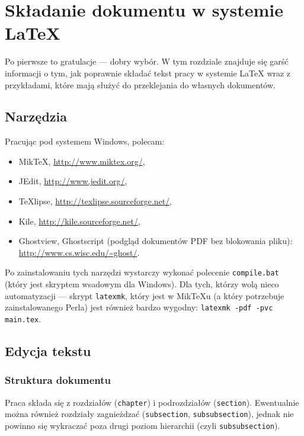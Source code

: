 
\chapter{Składanie dokumentu w systemie \LaTeX}

Po pierwsze to gratulacje --- dobry wybór. W tym rozdziale znajduje się
garść informacji o tym, jak poprawnie składać tekst pracy w systemie \LaTeX{} wraz z 
przykładami, które mają służyć do przeklejania do własnych dokumentów.

\section{Narzędzia}
Pracując pod systemem Windows, polecam:
\begin{itemize}
    \item MikTeX, \url{http://www.miktex.org/},
    \item JEdit, \url{http://www.jedit.org/},
    \item TeXlipse, \url{http://texlipse.sourceforge.net/},
    \item Kile, \url{http://kile.sourceforge.net/},
    \item Ghostview, Ghostscript (podgląd dokumentów PDF bez blokowania pliku):\\
        \url{http://www.cs.wisc.edu/~ghost/}. 
\end{itemize}

Po zainstalowaniu tych narzędzi wystarczy wykonać polecenie \texttt{compile.bat} (który
jest skryptem wsadowym dla Windows). Dla tych, którzy wolą nieco automatyzacji --- skrypt
\texttt{latexmk}, który jest w MikTeXu (a który potrzebuje zainstalowanego Perla) jest
również bardzo wygodny: \texttt{latexmk -pdf -pvc main.tex}.

\section{Edycja tekstu}

\subsection{Struktura dokumentu}

Praca składa się z rozdziałów (\texttt{chapter}) i podrozdziałów (\texttt{section}).
Ewentualnie można również rozdziały zagnieżdzać (\texttt{subsection}, \texttt{subsubsection}),
jednak nie powinno się wykraczać poza drugi poziom hierarchii (czyli \texttt{subsubsection}).

